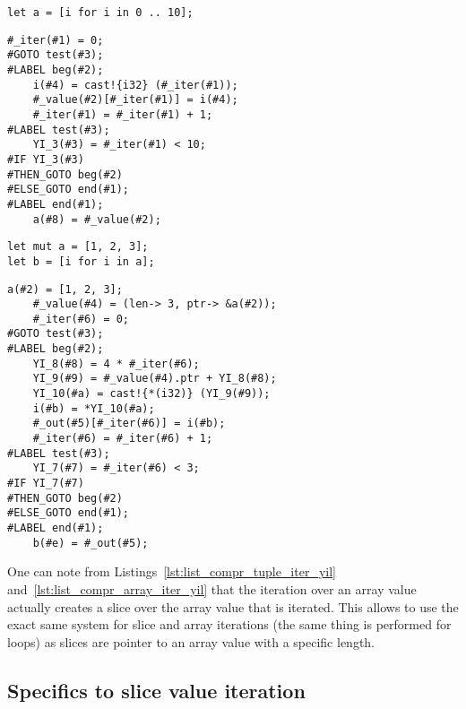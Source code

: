 \begin{lstlisting}[style=coloredverbatim, label=lst:list_compr_range_iter, caption=List comprehension iterating over a range]
let a = [i for i in 0 .. 10];
\end{lstlisting}

\begin{lstlisting}[style=intermediateVerb, label=lst:list_compr_range_iter_yil, caption=YIL representation of Listing~\ref{lst:list_compr_range_iter}]
    #_iter(#1) = 0;
#GOTO test(#3);
#LABEL beg(#2);
    i(#4) = cast!{i32} (#_iter(#1));
    #_value(#2)[#_iter(#1)] = i(#4);
    #_iter(#1) = #_iter(#1) + 1;
#LABEL test(#3);
    YI_3(#3) = #_iter(#1) < 10;
#IF YI_3(#3)
#THEN_GOTO beg(#2)
#ELSE_GOTO end(#1);
#LABEL end(#1);
    a(#8) = #_value(#2);
\end{lstlisting}

\begin{lstlisting}[style=coloredverbatim, label=lst:list_compr_array_iter, caption=List comprehension iterating over an array]
let mut a = [1, 2, 3];
let b = [i for i in a];
\end{lstlisting}

\begin{lstlisting}[style=intermediateVerb, label=lst:list_compr_array_iter_yil, caption=YIL representation of Listing~\ref{lst:list_compr_array_iter}]
    a(#2) = [1, 2, 3];
    #_value(#4) = (len-> 3, ptr-> &a(#2));
    #_iter(#6) = 0;
#GOTO test(#3);
#LABEL beg(#2);
    YI_8(#8) = 4 * #_iter(#6);
    YI_9(#9) = #_value(#4).ptr + YI_8(#8);
    YI_10(#a) = cast!{*(i32)} (YI_9(#9));
    i(#b) = *YI_10(#a);
    #_out(#5)[#_iter(#6)] = i(#b);
    #_iter(#6) = #_iter(#6) + 1;
#LABEL test(#3);
    YI_7(#7) = #_iter(#6) < 3;
#IF YI_7(#7)
#THEN_GOTO beg(#2)
#ELSE_GOTO end(#1);
#LABEL end(#1);
    b(#e) = #_out(#5);
\end{lstlisting}

One can note from Listings~\ref{lst:list_compr_tuple_iter_yil}
and~\ref{lst:list_compr_array_iter_yil} that the iteration over an array value
actually creates a slice over the array value that is iterated. This allows to
use the exact same system for slice and array iterations (the same thing is
performed for  loops) as slices are pointer to an array value with a
specific length.

\subsection{Specifics to slice value iteration}

